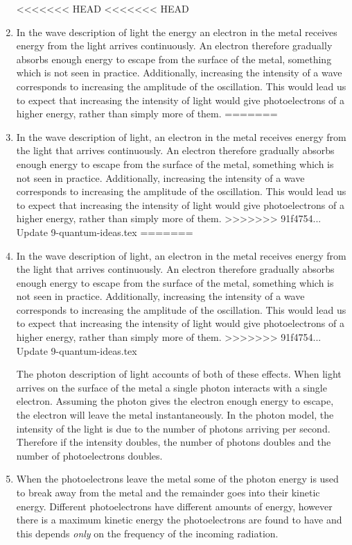 \documentclass[revision-guide.tex]{subfiles}
\begin{document}
\begin{enumerate}[label=\emph{(\alph*)}]
<<<<<<< HEAD
<<<<<<< HEAD
\item In the wave description of light the energy an electron in the metal receives energy from the light arrives continuously. An electron  therefore gradually absorbs enough energy to escape from the surface of the metal, something which is not seen in practice. Additionally, increasing the intensity of a wave corresponds to increasing the amplitude of the oscillation. This would lead us to expect that increasing the intensity of light would give photoelectrons of a higher energy, rather than simply more of them.
=======
\item In the wave description of light, an electron in the metal receives energy from the light that arrives continuously. An electron therefore gradually absorbs enough energy to escape from the surface of the metal, something which is not seen in practice. Additionally, increasing the intensity of a wave corresponds to increasing the amplitude of the oscillation. This would lead us to expect that increasing the intensity of light would give photoelectrons of a higher energy, rather than simply more of them.
>>>>>>> 91f4754... Update 9-quantum-ideas.tex
=======
\item In the wave description of light, an electron in the metal receives energy from the light that arrives continuously. An electron therefore gradually absorbs enough energy to escape from the surface of the metal, something which is not seen in practice. Additionally, increasing the intensity of a wave corresponds to increasing the amplitude of the oscillation. This would lead us to expect that increasing the intensity of light would give photoelectrons of a higher energy, rather than simply more of them.
>>>>>>> 91f4754... Update 9-quantum-ideas.tex

The photon description of light accounts of both of these effects. When light arrives on the surface of the metal a single photon interacts with a single electron. Assuming the photon gives the electron enough energy to escape, the electron will leave the metal instantaneously. In the photon model, the intensity of the light is due to the number of photons arriving per second. Therefore if the intensity doubles, the number of photons doubles and the number of photoelectrons doubles.

\item When the photoelectrons leave the metal some of the photon energy is used to break away from the metal and the remainder goes into their kinetic energy. Different photoelectrons have different amounts of energy, however there is a maximum kinetic energy the photoelectrons are found to have and this depends \emph{only} on the frequency of the incoming radiation.


\end{enumerate}
\end{document}
